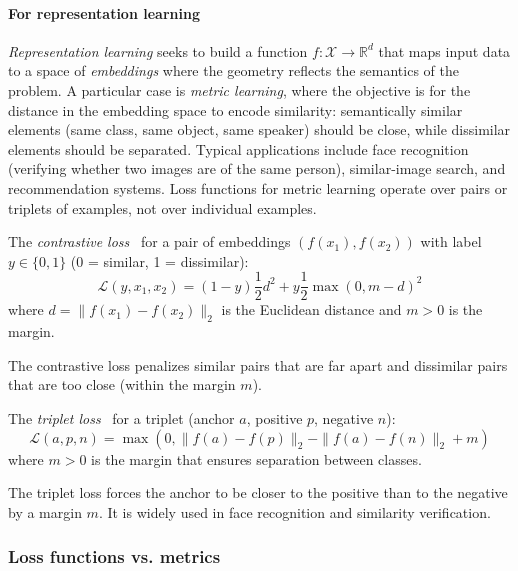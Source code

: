 \paragraph{For representation learning}

\textit{Representation learning} seeks to build a function \(f: \mathcal{X} \to \mathbb{R}^d\) that maps input data to a space of \textit{embeddings} where the geometry reflects the semantics of the problem. A particular case is \textit{metric learning}, where the objective is for the distance in the embedding space to encode similarity: semantically similar elements (same class, same object, same speaker) should be close, while dissimilar elements should be separated. Typical applications include face recognition (verifying whether two images are of the same person), similar-image search, and recommendation systems. Loss functions for metric learning operate over pairs or triplets of examples, not over individual examples.

\begin{definition}\label{def:contrastive_loss}
	The \textit{contrastive loss}~\citep{hadsell2006dimensionality} for a pair of embeddings \((f(x_1), f(x_2))\) with label \(y \in \{0, 1\}\) (0 = similar, 1 = dissimilar):
	\[
		\mathcal{L}(y, x_1, x_2) = (1-y) \frac{1}{2} d^2 + y \frac{1}{2} \max(0, m - d)^2
	\]
	where \(d = \|f(x_1) - f(x_2)\|_2\) is the Euclidean distance and \(m > 0\) is the margin.
\end{definition}

The contrastive loss penalizes similar pairs that are far apart and dissimilar pairs that are too close (within the margin \(m\)).

\begin{definition}\label{def:triplet_loss}
	The \textit{triplet loss}~\citep{schroff2015facenet} for a triplet (anchor \(a\), positive \(p\), negative \(n\)):
	\[
		\mathcal{L}(a, p, n) = \max(0, \|f(a) - f(p)\|_2 - \|f(a) - f(n)\|_2 + m)
	\]
	where \(m > 0\) is the margin that ensures separation between classes.
\end{definition}

The triplet loss forces the anchor to be closer to the positive than to the negative by a margin \(m\). It is widely used in face recognition and similarity verification.

\subsubsection{Loss functions vs. metrics}

